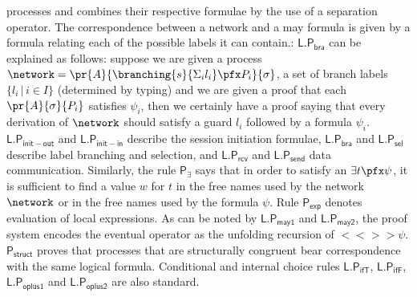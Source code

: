 processes and combines their respective formulae by the use of a
separation operator. The correspondence between a network and a may
formula is given by a formula relating each of the possible labels it
can contain.: 
$\mathsf{L.P_{bra}}$ can be explained as follows: suppose we are given a
process $\network = \pr{A}{\branching{s}{\Sigma_{i} l_i} \pfx P_i}{\sigma}$, a set of branch labels
$\{l_i \, | \, i \in I\} $ (determined by typing) and we are given a
proof that each $\pr{A}{\sigma}{P_i}$ satisfies $\psi_i$, then we certainly have a
proof saying that every derivation of $\network$ should satisfy a guard $l_i$
followed by a formula $\psi_i$. 
$\mathsf{L.P_{init-out}}$ and $\mathsf{L.P_{init-in}}$
describe the session initiation formulae, $\mathsf{L.P_{bra}}$ and
$\mathsf{L.P_{sel}}$ describe label branching and selection, and
$\mathsf{L.P_{rcv}}$ and $\mathsf{L.P_{send}}$ data communication. 
 Similarly,
the rule
$\mathsf{P_\exists}$ says that in order to satisfy an $\exists t\pfx
\psi$, it is sufficient to find a value $w$ for $t$ in the free names
used by the network $\network$ or in the free names used by the
formula $\psi$. Rule $\mathsf{P_{exp}}$ denotes
evaluation of local  expressions.
As can be noted by $\mathsf{L.P_{may1}}$ and
$\mathsf{L.P_{may2}}$, the proof system encodes the eventual operator as
the unfolding recursion of $<<>> \psi$. 
$\mathsf{P_{struct}}$ proves
that processes that are structurally congruent bear correspondence
with the same logical formula. Conditional and internal choice rules
$\mathsf{L.P_{ifT}}$, $\mathsf{L.P_{ifF}}$, $\mathsf{L.P_{oplus1}}$
and $\mathsf{L.P_{oplus2}}$ are also standard. 





